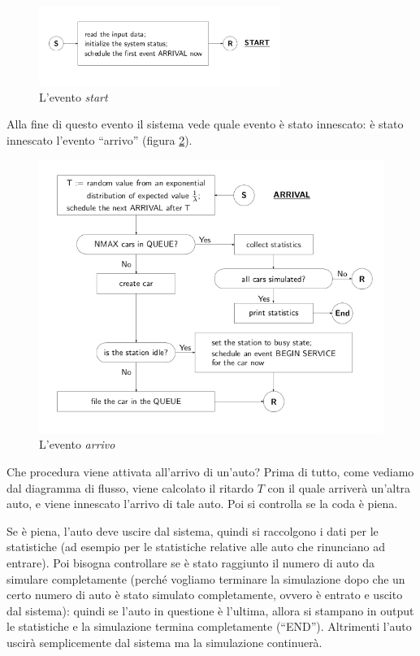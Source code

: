 \documentclass[11pt]{book}
\begin{document}
\begin{figure}[h!]
  \centering
  \includegraphics[width=0.7\textwidth]{images/cap11fig7.png}
  \caption{L'evento {\em start}}
  \label{cap11fig7}
\end{figure}

Alla fine di questo evento il sistema vede quale evento \`e stato
innescato: \`e stato innescato l'evento ``arrivo'' (figura
\ref{cap11fig8}).

\begin{figure}[h!]
  \centering
  \includegraphics[width=\textwidth]{images/cap11fig8.png}
  \caption{L'evento {\em arrivo}}
  \label{cap11fig8}
\end{figure}

Che procedura viene attivata all'arrivo di un'auto? Prima di tutto,
come vediamo dal diagramma di flusso, viene calcolato il ritardo $T$
con il quale arriver\`a un'altra auto, e viene innescato l'arrivo di
tale auto. Poi si controlla se la coda \`e piena. 

Se \`e piena, l'auto deve uscire dal sistema, quindi si raccolgono i
dati per le statistiche (ad esempio per le statistiche relative alle
auto che rinunciano ad entrare). Poi bisogna controllare se \`e stato
raggiunto il numero di auto da simulare completamente (perch\'e
vogliamo terminare la simulazione dopo che un certo numero di auto \`e
stato simulato completamente, ovvero \`e entrato e uscito dal sistema):
quindi se l'auto in questione \`e l'ultima, allora si stampano in
output le statistiche e la simulazione termina completamente
(``END''). Altrimenti l'auto uscir\`a semplicemente dal sistema ma la
simulazione continuer\`a. 
\end{document}
